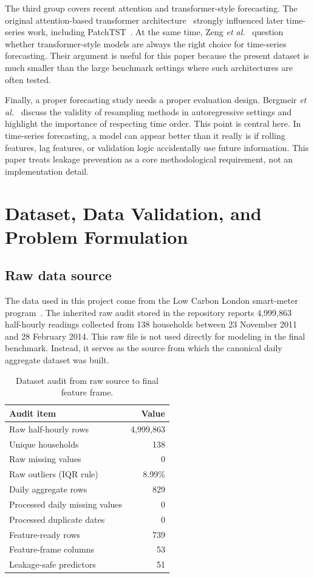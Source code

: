 \documentclass[conference]{IEEEtran}
\begin{document}
The third group covers recent attention and transformer-style forecasting. The original attention-based transformer architecture~\cite{vaswani2017attention} strongly influenced later time-series work, including PatchTST~\cite{nie2023patchtst}. At the same time, Zeng \emph{et al.}~\cite{zeng2023transformers} question whether transformer-style models are always the right choice for time-series forecasting. Their argument is useful for this paper because the present dataset is much smaller than the large benchmark settings where such architectures are often tested.

Finally, a proper forecasting study needs a proper evaluation design. Bergmeir \emph{et al.}~\cite{bergmeir2018validity} discuss the validity of resampling methods in autoregressive settings and highlight the importance of respecting time order. This point is central here. In time-series forecasting, a model can appear better than it really is if rolling features, lag features, or validation logic accidentally use future information. This paper treats leakage prevention as a core methodological requirement, not an implementation detail.

\section{Dataset, Data Validation, and Problem Formulation}
\subsection{Raw data source}
The data used in this project come from the Low Carbon London smart-meter program~\cite{lcl2014}. The inherited raw audit stored in the repository reports 4,999,863 half-hourly readings collected from 138 households between 23 November 2011 and 28 February 2014. This raw file is not used directly for modeling in the final benchmark. Instead, it serves as the source from which the canonical daily aggregate dataset was built.

\begin{table}[t]
\caption{Dataset audit from raw source to final feature frame.}
\label{tab:data_audit}
\centering
\begin{tabular}{p{4.2cm}r}
\toprule
\textbf{Audit item} & \textbf{Value} \\
\midrule
Raw half-hourly rows & 4,999,863 \\
Unique households & 138 \\
Raw missing values & 0 \\
Raw outliers (IQR rule) & 8.99\% \\
Daily aggregate rows & 829 \\
Processed daily missing values & 0 \\
Processed duplicate dates & 0 \\
Feature-ready rows & 739 \\
Feature-frame columns & 53 \\
Leakage-safe predictors & 51 \\
\bottomrule
\end{tabular}
\end{table}
\end{document}
